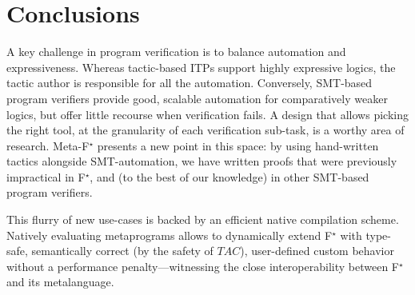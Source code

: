 \documentclass[runningheads]{llncs}
\newcommand\fstar{F$^\star$\xspace}
\newcommand\metafstar{Meta-F$^\star$\xspace}
\begin{document}




\section{Conclusions}
\label{sec:conclusions}

A key challenge in program verification is to balance
automation and expressiveness. Whereas tactic-based ITPs
support highly expressive logics, the tactic author is responsible for all
the automation.
%
Conversely, SMT-based program verifiers
provide good, scalable automation for comparatively weaker logics, but offer
little recourse when verification fails. A design that allows picking the
right tool, at the granularity of each verification sub-task, is a
worthy area of research.
%
\metafstar presents a new point in this space: by using hand-written
tactics alongside SMT-automation, we have written
proofs that were previously impractical in \fstar, and
(to the best of our
knowledge) in other SMT-based program verifiers.


\iffull
This flurry of new use-cases is backed by an efficient native
compilation scheme.
%
Natively evaluating metaprograms allows to dynamically extend
\fstar with type-safe, semantically correct (by the safety of
\ls$TAC$), user-defined custom behavior without a performance
penalty---witnessing the close interoperability between \fstar and its
metalanguage.
\fi
\end{document}
